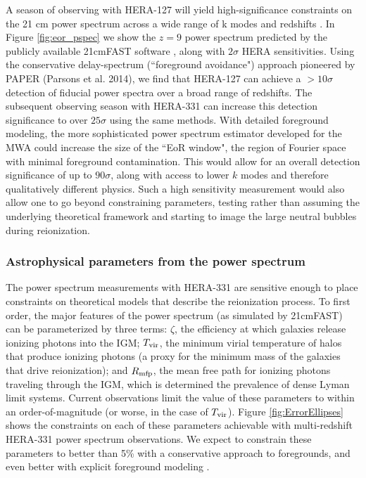 \documentclass[preprint]{aastex}
\begin{document}
A season of observing with HERA-127 will yield high-significance constraints on the 21 cm power 
spectrum across a wide range of k modes and redshifts \citep{pober_et_al2014}.  In Figure \ref{fig:eor_pspec} we show 
the $z=9$ power spectrum predicted by the publicly available 21cmFAST software \citep{mesinger_et_al2011}, 
along with $2\sigma$ HERA sensitivities.  Using the conservative delay-spectrum (``foreground avoidance") 
approach pioneered by PAPER (Parsons et al. 2014), we find that HERA-127 can achieve a $> 10\sigma$ detection 
of fiducial power spectra over a broad range of redshifts.  The subsequent observing season with HERA-331 can 
increase this detection significance to over $25\sigma$ using the same methods.  With detailed foreground 
modeling, the more sophisticated power spectrum estimator developed for the MWA could increase the size of the 
``EoR window", the region of Fourier space with minimal foreground contamination. This would allow for an overall 
detection significance of up to $90\sigma$, along with access to lower $k$ modes and therefore qualitatively 
different physics.  Such a high sensitivity measurement would also allow one to go beyond constraining parameters, 
testing rather than assuming  the underlying theoretical framework and starting to image the large neutral bubbles during reionization.

\subsubsection{Astrophysical parameters from the power spectrum}

The power spectrum measurements with HERA-331 are sensitive enough to place constraints on theoretical models that 
describe the reionization process.  To first order, the major features of the power spectrum (as simulated by 
21cmFAST) can be parameterized by three terms: $\zeta$, the efficiency at which galaxies release ionizing photons 
into the IGM; $T_{\rm vir}$, the minimum virial temperature of halos that produce ionizing photons (a proxy for 
the minimum mass of the galaxies that drive reionization); and $R_{\rm mfp}$, the mean free path for ionizing 
photons traveling through the IGM, which is determined the prevalence of dense Lyman limit systems.  Current 
observations limit the value of these parameters to within an order-of-magnitude (or worse, in the case of 
$T_{\rm vir}$).  Figure \ref{fig:ErrorEllipses} shows the constraints on each of these parameters achievable 
with multi-redshift HERA-331 power spectrum observations.  We expect to constrain these parameters to better 
than 5\% with a conservative approach to foregrounds, and even better with explicit foreground modeling \citep{pober_et_al2014}.
\end{document}
